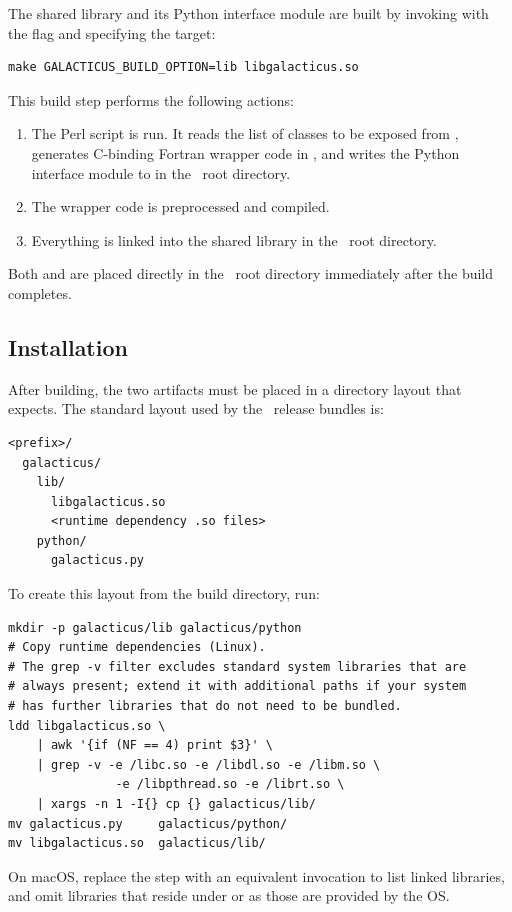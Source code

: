The shared library and its Python interface module are built by invoking  with the  flag and specifying the  target:
\begin{verbatim}
make GALACTICUS_BUILD_OPTION=lib libgalacticus.so
\end{verbatim}
This build step performs the following actions:
\begin{enumerate}
  \item The Perl script  is run. It reads the list of classes to be exposed from , generates C-binding Fortran wrapper code in , and writes the Python interface module to  in the \glc\ root directory.
  \item The wrapper code is preprocessed and compiled.
  \item Everything is linked into the shared library  in the \glc\ root directory.
\end{enumerate}
Both  and  are placed directly in the \glc\ root directory immediately after the build completes.

\subsection{Installation}\label{sec:pythonInterface:build:install}

After building, the two artifacts must be placed in a directory layout that  expects. The standard layout used by the \glc\ release bundles is:
\begin{verbatim}
<prefix>/
  galacticus/
    lib/
      libgalacticus.so
      <runtime dependency .so files>
    python/
      galacticus.py
\end{verbatim}
To create this layout from the build directory, run:
\begin{verbatim}
mkdir -p galacticus/lib galacticus/python
# Copy runtime dependencies (Linux).
# The grep -v filter excludes standard system libraries that are
# always present; extend it with additional paths if your system
# has further libraries that do not need to be bundled.
ldd libgalacticus.so \
    | awk '{if (NF == 4) print $3}' \
    | grep -v -e /libc.so -e /libdl.so -e /libm.so \
               -e /libpthread.so -e /librt.so \
    | xargs -n 1 -I{} cp {} galacticus/lib/
mv galacticus.py     galacticus/python/
mv libgalacticus.so  galacticus/lib/
\end{verbatim}
On macOS, replace the \mono{ldd} step with an equivalent  invocation to list linked libraries, and omit libraries that reside under  or  as those are provided by the OS.

